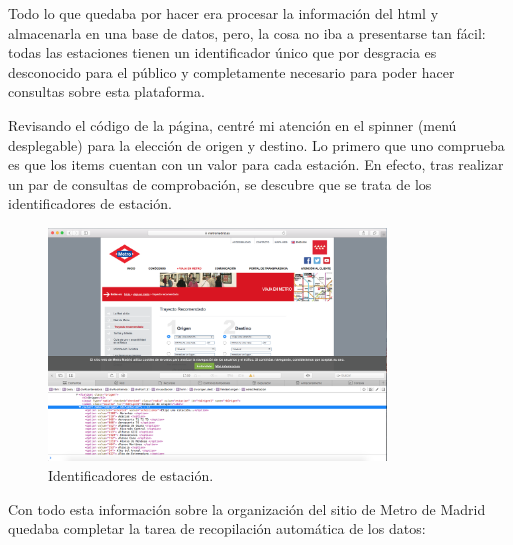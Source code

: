 \documentclass[spanish, a4paper, 12pt] {article}
\begin{document}
Todo lo que quedaba por hacer era procesar la información del html y almacenarla en una base de datos, pero, la cosa no iba a presentarse tan fácil: todas las estaciones tienen un identificador único que por desgracia es desconocido para el público y completamente necesario para poder hacer consultas sobre esta plataforma.\\ \par
Revisando el código de la página, centré mi atención en el spinner (menú desplegable) para la elección de origen y destino. Lo primero que uno comprueba es que los items cuentan con un valor para cada estación. En efecto, tras realizar un par de consultas de comprobación, se descubre que se trata de los identificadores de estación.\\ \par
{\begin{figure}[!ht]
\centering
\includegraphics[width=0.8\textwidth]{id}
\caption{Identificadores de estación.}
\end{figure}}
Con todo esta información sobre la organización del sitio de Metro de Madrid quedaba completar la tarea de recopilación automática de los datos:
\end{document}
